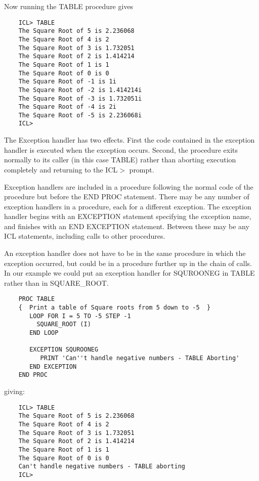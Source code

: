 Now running the TABLE procedure gives

\begin{verbatim}
    ICL> TABLE
    The Square Root of 5 is 2.236068
    The Square Root of 4 is 2
    The Square Root of 3 is 1.732051
    The Square Root of 2 is 1.414214
    The Square Root of 1 is 1
    The Square Root of 0 is 0
    The Square Root of -1 is 1i
    The Square Root of -2 is 1.414214i
    The Square Root of -3 is 1.732051i
    The Square Root of -4 is 2i
    The Square Root of -5 is 2.236068i
    ICL>
\end{verbatim}
The Exception handler has two effects. First the code contained in the 
exception handler is executed when the exception occurs. Second, the procedure
exits normally to its caller (in this case TABLE) rather than aborting
execution completely and returning to the ICL$>$ prompt.

Exception handlers are included in a procedure following the normal code
of the procedure but before the END PROC statement. There may be any number
of exception handlers in a procedure, each for a different exception.
The exception handler begins with an EXCEPTION statement specifying the
exception name, and finishes with an END EXCEPTION statement. Between
these may be any ICL statements, including calls to other procedures.

An exception handler does not have to be in the same procedure in which the
exception occurred, but could be in a procedure further up in the chain of 
calls. In our example we could put an exception handler for SQUROONEG in
TABLE rather than in SQUARE\_ROOT.

\begin{verbatim}
    PROC TABLE
    {  Print a table of Square roots from 5 down to -5  }
       LOOP FOR I = 5 TO -5 STEP -1
         SQUARE_ROOT (I)
       END LOOP

       EXCEPTION SQUROONEG
          PRINT 'Can''t handle negative numbers - TABLE Aborting'
       END EXCEPTION
    END PROC
\end{verbatim}

giving:

\begin{verbatim}
    ICL> TABLE
    The Square Root of 5 is 2.236068
    The Square Root of 4 is 2
    The Square Root of 3 is 1.732051
    The Square Root of 2 is 1.414214
    The Square Root of 1 is 1
    The Square Root of 0 is 0
    Can't handle negative numbers - TABLE aborting
    ICL>
\end{verbatim}

